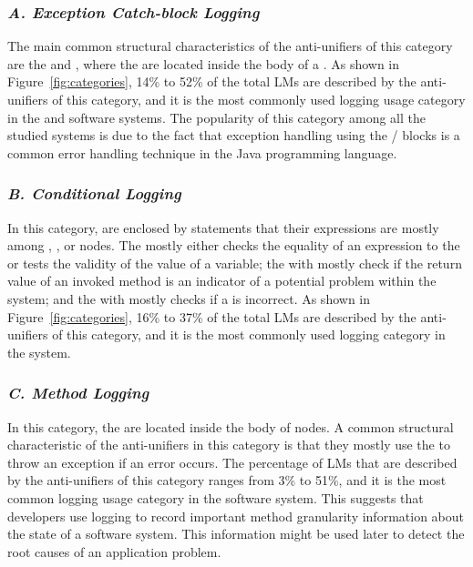 
\subsubsection{\emph{A. Exception Catch-block Logging}}  \label{Exception catch-block logging}
The main common structural characteristics of the anti-unifiers of this category are the  and  , where the  are located inside the body of a . As shown in Figure~\ref{fig:categories}, 14\% to 52\% of the total LMs are described by the anti-unifiers of this category, and it is the most commonly used logging usage category in the  and  software systems. The popularity of this category among all the studied systems is due to the fact that exception handling using the / blocks is a common error handling technique in the Java programming language.


\subsubsection{\emph{B. Conditional Logging}}  \label{conditional logging}
In this category,  are enclosed by  statements that their expressions are mostly among  ,  , or   nodes. The   mostly either checks the equality of an expression to the   or tests the validity of the value of a variable; the   with   mostly check if the return value of an invoked method is an indicator of a potential problem within the system; and the   with  mostly checks if a   is incorrect. As shown in Figure~\ref{fig:categories}, 16\% to 37\% of the total LMs are described by the anti-unifiers of this category, and it is the most commonly used logging category in the  system.

\subsubsection{\emph{C. Method Logging}}  \label{method logging}
In this category, the  are located inside the body of  nodes. A common structural characteristic of the anti-unifiers in this category is that they mostly use the  to throw an exception if an error occurs. The percentage of LMs that are described by the anti-unifiers of this category ranges from 3\% to 51\%, and it is the most common logging usage category in the  software system. This suggests that developers use logging to record important method granularity information about the state of a software system. This information might be used later to detect the root causes of an application problem.



